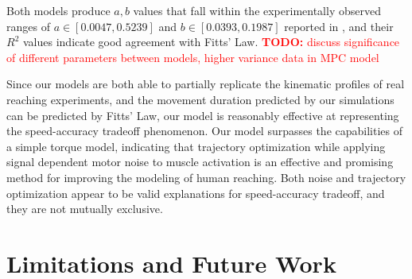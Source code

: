 \documentclass[letterpaper, 10pt, conference]{ieeeconf}
\newcommand{\todo}[1]{\textcolor{red}{\textbf{TODO:} #1}}
\begin{document}
Both models produce $a,b$ values that fall within the experimentally observed ranges of $a \in [0.0047, 0.5239]$ and $b \in [0.0393,0.1987]$ reported in \cite{fitts_law_exp_data}, and their $R^2$ values indicate good agreement with Fitts' Law.
\todo{discuss significance of different parameters between models, higher variance data in MPC model}


Since our models are both able to partially replicate the kinematic profiles of real reaching experiments, and the movement duration predicted by our simulations can be predicted by Fitts' Law, our model is reasonably effective at representing the speed-accuracy tradeoff phenomenon.
Our model surpasses the capabilities of a simple torque model, indicating that trajectory optimization while applying signal dependent motor noise to muscle activation is an effective and promising method for improving the modeling of human reaching.
Both noise and trajectory optimization appear to be valid explanations for speed-accuracy tradeoff, and they are not mutually exclusive.

\section{Limitations and Future Work}
\end{document}
